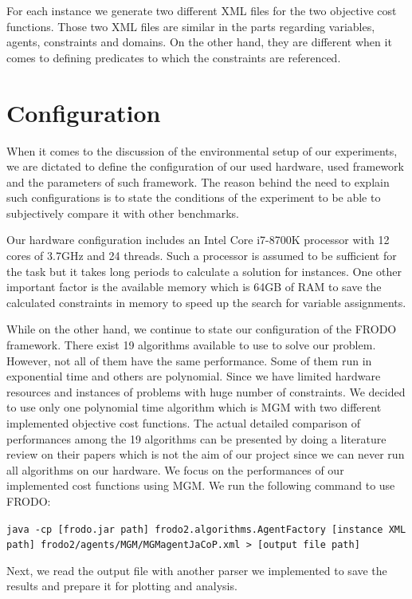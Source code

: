 \documentclass{article}
\begin{document}
	For each instance we generate two different XML files for the two objective cost functions. Those two XML files are similar in the parts regarding variables, agents, constraints and domains. On the other hand, they are different when it comes to defining predicates to which the constraints are referenced.
	
	\section{Configuration}
	When it comes to the discussion of the environmental setup of our experiments, we are dictated to define the configuration of our used hardware, used framework and the parameters of such framework. The reason behind the need to explain such configurations is to state the conditions of the experiment to be able to subjectively compare it with other benchmarks.
	
	Our hardware configuration includes an Intel Core i7-8700K processor with 12 cores of 3.7GHz and 24 threads. Such a processor is assumed to be sufficient for the task but it takes long periods to calculate a solution for instances. One other important factor is the available memory which is 64GB of RAM to save the calculated constraints in memory to speed up the search for variable assignments.
	
	While on the other hand, we continue to state our configuration of the FRODO framework. There exist 19 algorithms available to use to solve our problem. However, not all of them have the same performance. Some of them run in exponential time and others are polynomial. Since we have limited hardware resources and instances of problems with huge number of constraints. We decided to use only one polynomial time algorithm which is MGM with two different implemented objective cost functions. The actual detailed comparison of performances among the 19 algorithms can be presented by doing a literature review on their papers which is not the aim of our project since we can never run all algorithms on our hardware. We focus on the performances of our implemented cost functions using MGM. We run the following command to use FRODO:
	
	\texttt{java -cp [frodo.jar path] frodo2.algorithms.AgentFactory [instance XML path] frodo2/agents/MGM/MGMagentJaCoP.xml > [output file path]}
	
	Next, we read the output file with another parser we implemented to save the results and prepare it for plotting and analysis.
	
\end{document}

